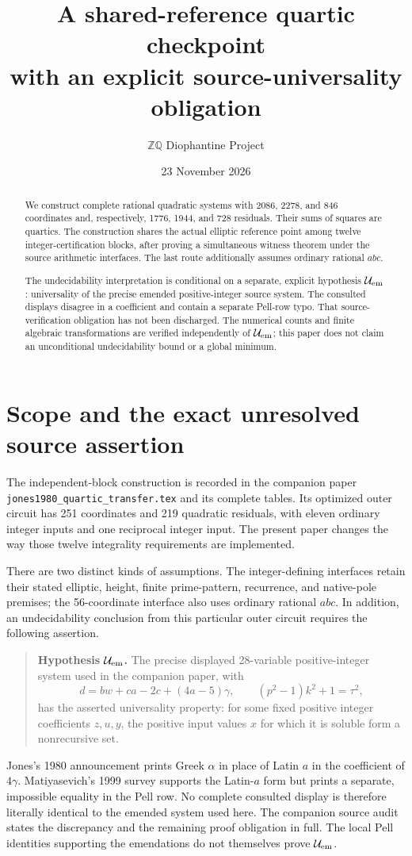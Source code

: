 \documentclass[11pt]{article}
\title{A shared-reference quartic checkpoint\\with an explicit source-universality obligation}
\author{\(\mathbb Z\mathbb Q\) Diophantine Project}
\date{23 November 2026}
\begin{document}
\maketitle
\begin{abstract}
We construct complete rational quadratic systems with 2086, 2278, and
846 coordinates and, respectively, 1776, 1944, and 728 residuals. Their
sums of squares are quartics. The construction shares the actual elliptic
reference point among twelve integer-certification blocks, after proving
a simultaneous witness theorem under the source arithmetic interfaces.
The last route additionally assumes ordinary rational \(abc\).

The undecidability interpretation is conditional on a separate, explicit
hypothesis \(\mathcal U_{\rm em}\): universality of the precise emended
positive-integer source system. The consulted displays disagree in a
coefficient and contain a separate Pell-row typo. That source-verification
obligation has not been discharged. The numerical counts and finite
algebraic transformations are verified independently of
\(\mathcal U_{\rm em}\); this paper does not claim an unconditional
undecidability bound or a global minimum.
\end{abstract}

\section{Scope and the exact unresolved source assertion}
The independent-block construction is recorded in the companion paper
\nolinkurl{jones1980_quartic_transfer.tex} and its complete tables. Its
optimized outer circuit has 251 coordinates and 219 quadratic residuals,
with eleven ordinary integer inputs and one reciprocal integer input.
The present paper changes the way those twelve integrality requirements
are implemented.

There are two distinct kinds of assumptions. The integer-defining
interfaces retain their stated elliptic, height, finite prime-pattern,
recurrence, and native-pole premises; the 56-coordinate interface also
uses ordinary rational \(abc\). In addition, an undecidability conclusion
from this particular outer circuit requires the following assertion.
\begin{quote}
\textbf{Hypothesis \(\mathcal U_{\rm em}\).}
The precise displayed 28-variable positive-integer system used in the
companion paper, with
\[
 d=bw+ca-2c+(4a-5)\gamma,
 \qquad (p^2-1)k^2+1=\tau^2,
\]
has the asserted universality property: for some fixed positive integer
coefficients \(z,u,y\), the positive input values \(x\) for which it is
soluble form a nonrecursive set.
\end{quote}
Jones's 1980 announcement prints Greek \(\alpha\) in place of Latin
\(a\) in the coefficient of \(4\gamma\). Matiyasevich's 1999 survey
supports the Latin-\(a\) form but prints a separate, impossible equality
in the Pell row. No complete consulted display is therefore literally
identical to the emended system used here. The companion source audit
states the discrepancy and the remaining proof obligation in full.
The local Pell identities supporting the emendations do not themselves
prove \(\mathcal U_{\rm em}\).
\end{document}
